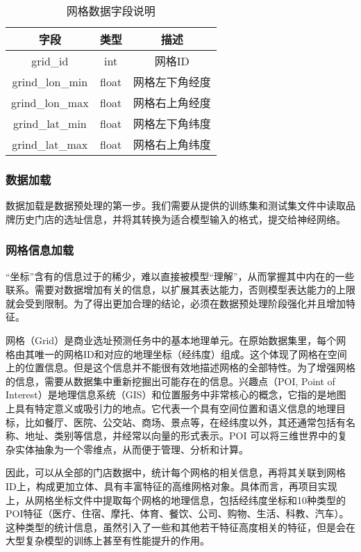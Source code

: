 \documentclass{article}
\begin{document}
\begin{table}[H]
\centering
\begin{tabular}{|c|c|c|}
\hline
\rowcolor[HTML]{D9EAD3}
\textbf{字段} & \textbf{类型} & \textbf{描述} \\ \hline
grid\_id & int & 网格ID \\ \hline
grind\_lon\_min & float & 网格左下角经度 \\ \hline
grind\_lon\_max & float & 网格右上角经度 \\ \hline
grind\_lat\_min & float & 网格左下角纬度 \\ \hline
grind\_lat\_max & float & 网格右上角纬度 \\ \hline
\end{tabular}
\caption{网格数据字段说明}
\label{tab:grid_fields}
\end{table}

\subsubsection{数据加载}

数据加载是数据预处理的第一步。我们需要从提供的训练集和测试集文件中读取品牌历史门店的选址信息，并将其转换为适合模型输入的格式，提交给神经网络。

\subsubsection{网格信息加载}

“坐标”含有的信息过于的稀少，难以直接被模型“理解”，从而掌握其中内在的一些联系。需要对数据增加有关的信息，以扩展其表达能力，否则模型表达能力的上限就会受到限制\cite{Shalev-Shwartz2014UnderstandingML}。为了得出更加合理的结论，必须在数据预处理阶段强化并且增加特征。

网格（Grid）是商业选址预测任务中的基本地理单元。在原始数据集里，每个网格由其唯一的网格ID和对应的地理坐标（经纬度）组成。这个体现了网格在空间上的位置信息。但是这个信息并不能很有效地描述网格的全部特性。为了增强网格的信息，需要从数据集中重新挖掘出可能存在的信息。兴趣点（POI, Point of Interest）是地理信息系统（GIS）和位置服务中非常核心的概念，它指的是地图上具有特定意义或吸引力的地点。它代表一个具有空间位置和语义信息的地理目标，比如餐厅、医院、公交站、商场、景点等，在经纬度以外，其还通常包括有名称、地址、类别等信息，并经常以向量的形式表示。POI 可以将三维世界中的复杂实体抽象为一个零维点，从而便于管理、分析和计算\cite{psyllidis_points_2022}。

因此，可以从全部的门店数据中，统计每个网格的相关信息，再将其关联到网格ID上，构成更加立体、具有丰富特征的高维网格对象。具体而言，再项目实现上，从网格坐标文件中提取每个网格的地理信息，包括经纬度坐标和10种类型的POI特征（医疗、住宿、摩托、体育、餐饮、公司、购物、生活、科教、汽车）。这种类型的统计信息，虽然引入了一些和其他若干特征高度相关的特征，但是会在大型复杂模型的训练上甚至有性能提升的作用\cite{Heaton_2016}。
\end{document}
